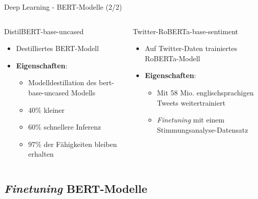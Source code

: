 \documentclass[aspectratio=169]{beamer}
\begin{document}
\begin{frame}{Deep Learning - BERT-Modelle (2/2)}
	\begin{columns}[T]
		\begin{block}{DistilBERT-base-uncased}
			\begin{itemize}
				\item Destilliertes BERT-Modell
				\item \textbf{Eigenschaften}:
				      \begin{itemize}
					      \item Modelldestillation des bert-base-uncased Modells
					      \item 40\% kleiner
					      \item 60\% schnellere Inferenz
					      \item 97\% der Fähigkeiten bleiben erhalten
				      \end{itemize}
			\end{itemize}
			\vspace{0.04cm}
		\end{block}
		\begin{block}{Twitter-RoBERTa-base-sentiment}
			\begin{itemize}
				\item Auf Twitter-Daten trainiertes RoBERTa-Modell
				\item \textbf{Eigenschaften}:
				      \begin{itemize}
					      \item Mit 58 Mio. englischsprachigen Tweets weitertrainiert
					      \item \textit{Finetuning} mit einem Stimmungsanalyse-Datensatz
				      \end{itemize}
			\end{itemize}
			\vfill
		\end{block}
	\end{columns}
\end{frame}


\subsection{\textit{Finetuning} BERT-Modelle}
\end{document}
